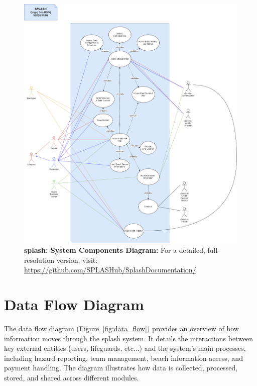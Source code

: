 \begin{figure}[H]
      \centering
      \includegraphics[width=16cm]{figs/use_case_diagram.png}
      \caption{ \textbf{\ac{splash}: System Components Diagram:} For a detailed, full-resolution version, visit: 
      \url{https://github.com/SPLASHub/SplashDocumentation/}}
      \label{fig:componets}
\end{figure}

\newpage
\section{Data Flow Diagram}

The data flow diagram (Figure~\ref{fig:data_flow}) provides an overview of how information moves through the \ac{splash} system. It details the interactions between key external entities (users, lifeguards, etc...) and the system’s main processes, including hazard reporting, team management, beach information access, and payment handling. The diagram illustrates how data is collected, processed, stored, and shared across different modules.

